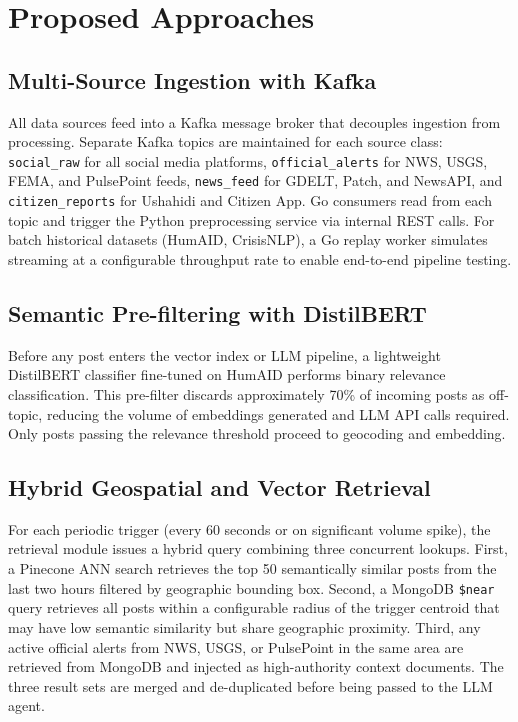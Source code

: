 \documentclass[conference]{IEEEtran}
\begin{document}
\section{Proposed Approaches}

\subsection{Multi-Source Ingestion with Kafka}

All data sources feed into a Kafka message broker that decouples ingestion from
processing. Separate Kafka topics are maintained for each source class:
\texttt{social\_raw} for all social media platforms, \texttt{official\_alerts}
for NWS, USGS, FEMA, and PulsePoint feeds, \texttt{news\_feed} for GDELT,
Patch, and NewsAPI, and \texttt{citizen\_reports} for Ushahidi and Citizen App.
Go consumers read from each topic and trigger the Python preprocessing service
via internal REST calls. For batch historical datasets (HumAID, CrisisNLP), a
Go replay worker simulates streaming at a configurable throughput rate to enable
end-to-end pipeline testing.

\subsection{Semantic Pre-filtering with DistilBERT}

Before any post enters the vector index or LLM pipeline, a lightweight
DistilBERT classifier fine-tuned on HumAID performs binary relevance
classification. This pre-filter discards approximately 70\% of incoming posts
as off-topic, reducing the volume of embeddings generated and LLM API calls
required. Only posts passing the relevance threshold proceed to geocoding and
embedding.

\subsection{Hybrid Geospatial and Vector Retrieval}

For each periodic trigger (every 60 seconds or on significant volume spike),
the retrieval module issues a hybrid query combining three concurrent lookups.
First, a Pinecone ANN search retrieves the top 50 semantically similar posts
from the last two hours filtered by geographic bounding box. Second, a MongoDB
\texttt{\$near} query retrieves all posts within a configurable radius of the
trigger centroid that may have low semantic similarity but share geographic
proximity. Third, any active official alerts from NWS, USGS, or PulsePoint
in the same area are retrieved from MongoDB and injected as high-authority
context documents. The three result sets are merged and de-duplicated before
being passed to the LLM agent.
\end{document}
